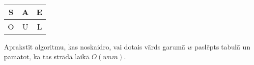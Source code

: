 \documentclass[a4paper]{article}
\begin{document}
\begin{tabular}{|c|c|c|} \hline
S & A & E\\ \hline
O & U & L\\ \hline
\end{tabular}

Aprakstīt algoritmu, kas noskaidro, vai dotais vārds garumā $w$ paslēpts
tabulā un pamatot, ka tas strādā laikā $O(wnm)$.


















\end{document}
